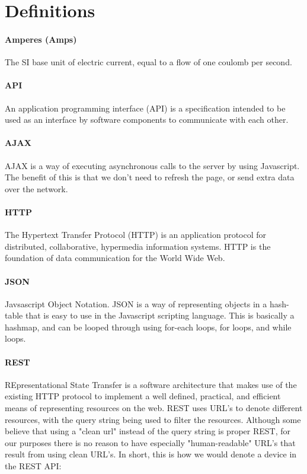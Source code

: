 
\section{Definitions}

\paragraph{Amperes (Amps)}
The SI base unit of electric current, equal to a flow of one coulomb per second.

\paragraph{API}
An application programming interface (API) is a specification intended to be used as an interface by software components to communicate with each other.

\paragraph{AJAX}
AJAX is a way of executing asynchronous calls to the server by using Javascript. 
The benefit of this is that we don't need to refresh the page, or send extra data over the network.

\paragraph{HTTP}
The Hypertext Transfer Protocol (HTTP) is an application protocol for distributed, collaborative, hypermedia information systems. 
HTTP is the foundation of data communication for the World Wide Web.

\paragraph{JSON}
Javsascript Object Notation. 
JSON is a way of representing objects in a hash-table that is easy to use in the Javascript scripting language. 
This is basically a hashmap, and can be looped through using for-each loops, for loops, and while loops.

\paragraph{REST}
REpresentational State Transfer is a software architecture that makes use of the existing HTTP protocol to implement a well defined, practical, and efficient means of representing resources on the web.
REST uses URL's to denote different resources, with the query string being used to filter the resources. 
Although some believe that using a "clean url" instead of the query string is proper REST, for our purposes there is no reason to have especially "human-readable" URL's that result from using clean URL's.
In short, this is how we would denote a device in the REST API:


